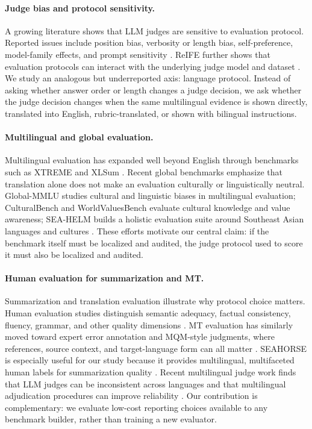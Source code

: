 \documentclass{article}
\begin{document}
\paragraph{Judge bias and protocol sensitivity.}
A growing literature shows that LLM judges are sensitive to evaluation protocol. Reported issues include position bias, verbosity or length bias, self-preference, model-family effects, and prompt sensitivity \citep{wang2023large,shi2024judging,dubois2024length,wataoka2024self,bavaresco2024llms}. ReIFE further shows that evaluation protocols can interact with the underlying judge model and dataset \citep{liu2024reife}. We study an analogous but underreported axis: language protocol. Instead of asking whether answer order or length changes a judge decision, we ask whether the judge decision changes when the same multilingual evidence is shown directly, translated into English, rubric-translated, or shown with bilingual instructions.

\paragraph{Multilingual and global evaluation.}
Multilingual evaluation has expanded well beyond English through benchmarks such as XTREME and XLSum \citep{hu2020xtreme,hasan2021xlsum}. Recent global benchmarks emphasize that translation alone does not make an evaluation culturally or linguistically neutral. Global-MMLU studies cultural and linguistic biases in multilingual evaluation; CulturalBench and WorldValuesBench evaluate cultural knowledge and value awareness; SEA-HELM builds a holistic evaluation suite around Southeast Asian languages and cultures \citep{singh2024global,chiu2024culturalbench,zhao2024worldvaluesbench,susanto2025seahelm}. These efforts motivate our central claim: if the benchmark itself must be localized and audited, the judge protocol used to score it must also be localized and audited.

\paragraph{Human evaluation for summarization and MT.}
Summarization and translation evaluation illustrate why protocol choice matters. Human evaluation studies distinguish semantic adequacy, factual consistency, fluency, grammar, and other quality dimensions \citep{fabbri2021summieval,maynez2020faithfulness}. MT evaluation has similarly moved toward expert error annotation and MQM-style judgments, where references, source context, and target-language form can all matter \citep{freitag2021experts,freitag2022results}. SEAHORSE is especially useful for our study because it provides multilingual, multifaceted human labels for summarization quality \citep{clark2023seahorse}. Recent multilingual judge work finds that LLM judges can be inconsistent across languages and that multilingual adjudication procedures can improve reliability \citep{fu2025reliable,fu2026languages}. Our contribution is complementary: we evaluate low-cost reporting choices available to any benchmark builder, rather than training a new evaluator.
\end{document}
